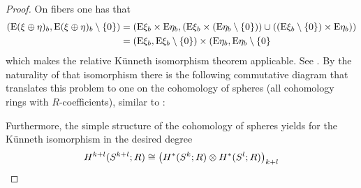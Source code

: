 \begin{Cor}
\begin{proof}
    On fibers one has that
    \begin{align*}
      (\mathrm{E}(\xi\oplus\eta)_b, {\mathrm{E}(\xi\oplus\eta)_b}\setminus\{0\})
      &= \left(
        \mathrm{E}\xi_b\times\mathrm{E}\eta_b,
        \left(\mathrm{E}\xi_b\times({\mathrm{E}\eta_b}\setminus\{0\})\right)
        \cup
        \left(({\mathrm{E}\xi_b}\setminus\{0\})\times\mathrm{E}\eta_b\right)
        \right)
        \\
      &= (\mathrm{E}\xi_b, {\mathrm{E}\xi_b}\setminus\{0\})\times(\mathrm{E}\eta_b, {\mathrm{E}\eta_b}\setminus\{0\}
    \end{align*}
    which makes the relative Künneth isomorphism theorem applicable.
    See \forexample \cite[Theorem~3.18]{hatcher}.
    By the naturality of that isomorphism there is the
    following commutative diagram that translates this problem to one
    on the cohomology of spheres (all cohomology rings with
    $R$-coefficients),
    similar to \cite[proof of Theorem~3.19, p.~221]{hatcher}:
    \begin{center}
    \end{center}
    Furthermore, the simple structure of the cohomology of spheres
    yields for the Künneth isomorphism in the desired degree
    \begin{align*}
      \H^{\rkk+\rkl}(\Sphere{\rkk+\rkl};R)
      &\cong
        \left(\H^*(\Sphere{\rkk}; R)\otimes \H^*(\Sphere{\rkl}; R)\right)_{\rkk+\rkl}\\

\end{align*}
\end{proof}
\end{Cor}
